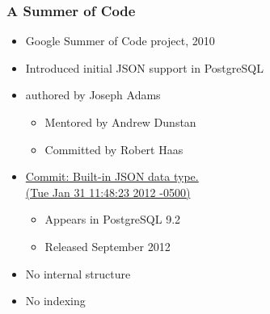 \newcommand{\linksize}{\scriptsize}



\begin{frame}[plain]
  \titlepage
\end{frame}

\begin{frame}
  \frametitle{A Summer of Code}

  \begin{itemize}
    \item Google Summer of Code project, 2010
    \item Introduced initial JSON support in PostgreSQL
    \item authored by Joseph Adams
      \begin{itemize}
	\item Mentored by Andrew Dunstan 
    	\item Committed by Robert Haas
      \end{itemize}
    \item 
      {\linksize \href{https://git.postgresql.org/cgit/postgresql.git/commit/?id=5384a73f98d9829725186a7b65bf4f8adb3cfaf1}{Commit: Built-in JSON data type. \faExternalLink \\ (Tue Jan 31 11:48:23 2012 -0500)}}
    \begin{itemize} \item Appears in PostgreSQL 9.2 \item Released September 2012 \end{itemize}
	  \pause
    \item No internal structure
    \item No indexing
  \end{itemize}

\end{frame}


